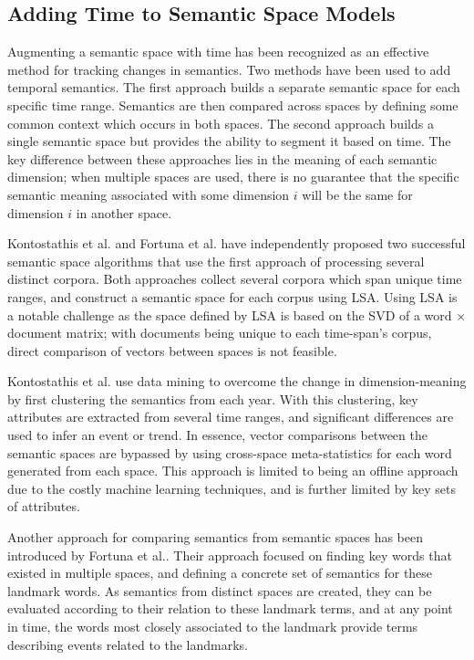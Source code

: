 \documentclass[a4paper,twocolumn,twoside,10pt]{ranlp}
\begin{document}
\subsection{Adding Time to Semantic Space Models}

Augmenting a semantic space with time has been recognized as an effective method
for tracking changes in semantics\cite{sahlgren08buzz}. Two methods have been
  used to add temporal semantics.  The first approach builds a separate semantic
  space for each specific time range.  Semantics are then compared across spaces
  by defining some common context which occurs in both spaces.  The second
  approach builds a single semantic space but provides the ability to segment it
  based on time.  The key difference between these approaches lies in the
  meaning of each semantic dimension; when multiple spaces are used, there is no
  guarantee that the specific semantic meaning associated with some dimension
  $i$ will be the same for dimension $i$ in another space.

Kontostathis et al.\cite{kontostathis04use} and Fortuna et
al.\cite{fortuna09visualization} have independently proposed two successful
semantic space algorithms that use the first approach of processing several
distinct corpora.  Both approaches collect several corpora which span unique
time ranges, and construct a semantic space for each corpus using LSA.  Using
LSA is a notable challenge as the space defined by LSA is based on the SVD of a
word $\times$ document matrix; with documents being unique to each time-span's
corpus, direct comparison of vectors between spaces is not feasible.

Kontostathis et al.\cite{kontostathis04use} use data mining to overcome the
change in dimension-meaning by first clustering the semantics from each year.
With this clustering, key attributes are extracted from several time ranges, and
significant differences are used to infer an event or trend.  In essence, vector
comparisons between the semantic spaces are bypassed by using cross-space
meta-statistics for each word generated from each space.  This approach is
limited to being an offline approach due to the costly machine learning
techniques, and is further limited by key sets of attributes.

Another approach for comparing semantics from semantic spaces has been
introduced by Fortuna et al.\cite{fortuna09visualization}.  Their approach
focused on finding key words that existed in multiple spaces, and defining a
concrete set of semantics for these landmark words.  As semantics from distinct
spaces are created, they can be evaluated according to their relation to these
landmark terms, and at any point in time, the words most closely associated to
the landmark provide terms describing events related to the landmarks.
\end{document}
